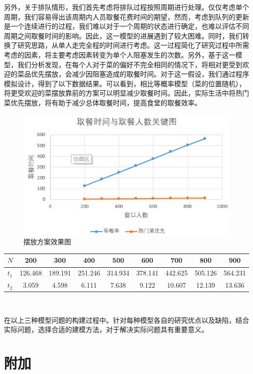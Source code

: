 \documentclass[lang=cn,10pt,a4paper]{elegantpaper}
\begin{document}
另外，关于排队情形，我们首先考虑将排队过程按照周期进行处理。仅仅考虑单个周期，我们容易得出该周期内人员取餐花费时间的期望，然而，考虑到队列的更新是一个连续进行的过程，我们难以对于一个周期的状态进行确定，也难以评估不同周期之间取餐时间的影响。因此，这一模型的进展遇到了较大困难。同时，我们转换了研究思路，从单人走完全程的时间进行考虑。这一过程简化了研究过程中所需考虑的因素，将主要考虑因素转变为单个人阻塞发生的次数。另外，基于这一模型，我们分析发现，在每个人对于菜的偏好不完全相同的情况下，将相对更受到欢迎的菜品优先摆放，会减少因阻塞造成的取餐时间。对于这一假设，我们通过程序模拟设计，得到了以下数据结果。可以看到，相比等概率模型（菜的位置随机），将更受欢迎的菜摆放靠前的方案可以明显减少取餐时间。因此，实际生活中将热门菜优先摆放，将有助于减少总体取餐时间，提高食堂的取餐效率。
\begin{figure}[htbp]
  \centering
  \includegraphics[scale=1]{./image/pic2.png}
  \caption{摆放方案效果图}
\end{figure}
\begin{center}
\begin{tabular}{|c|c|c|c|c|c|c|c|c|}
\hline
$N$&200&300&400&500&600&700&800&900\\
\hline
$t_1$&126.468&189.191&251.246&314.934&378.141&442.625&505.126&564.231\\
\hline
$t_2$&3.059&4.598&6.111&7.638&9.122&10.607&12.139&13.636\\
\hline
\end{tabular}\\
\end{center}


在以上三种模型问题的构建过程中。针对每种模型各自的研究优点以及缺陷，结合实际问题，选择合适的建模方法，对于解决实际问题具有重要意义。
\section{附加}
\end{document}
